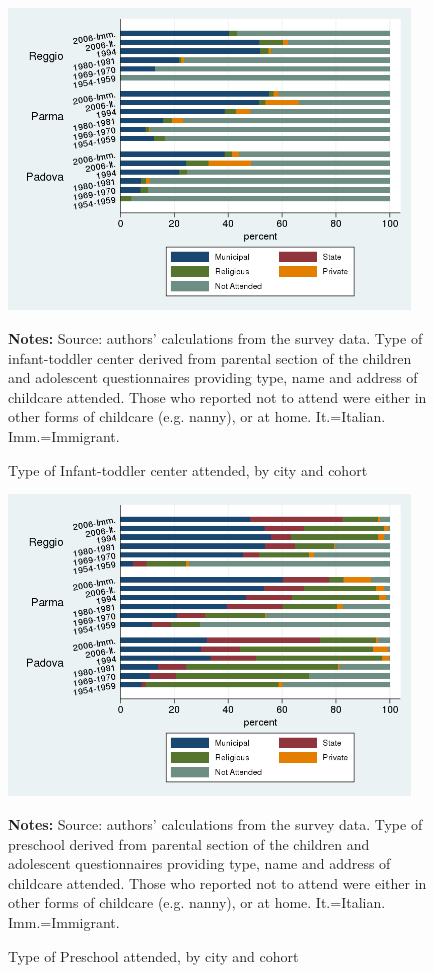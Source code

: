 \documentclass[12pt]{article}
\begin{document}
\begin{figure}[!htb]
\caption{Type of Infant-toddler center attended, by city and cohort}
\label{fig:asiloAttend}
\begin{center}
\includegraphics[height=8cm]{asiloType-Attend.png} \\[0pt]
\end{center}
\par
{\footnotesize {{\bfseries Notes:} Source: authors' calculations from the
survey data. Type of infant-toddler center derived from parental section of
the children and adolescent questionnaires providing type, name and address
of childcare attended. Those who reported not to attend were either in other
forms of childcare (e.g. nanny), or at home. It.=Italian. Imm.=Immigrant.} }
\end{figure}

\begin{figure}[!htb]
\caption{Type of Preschool attended, by city and cohort}
\label{fig:preschoolAttend}
\begin{center}
\includegraphics[height=8cm]{maternaType-Attend.png}\\[0pt]
\end{center}
\par
{\footnotesize {{\bfseries Notes:} Source: authors' calculations from the
survey data. Type of preschool derived from parental section of the children
and adolescent questionnaires providing type, name and address of childcare
attended. Those who reported not to attend were either in other forms of
childcare (e.g. nanny), or at home. It.=Italian. Imm.=Immigrant.} }
\end{figure}
\end{document}
